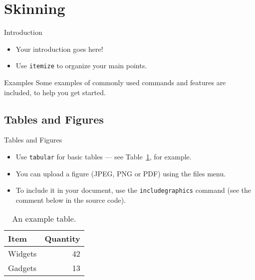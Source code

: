 \section{Skinning}

	\begin{frame}{Introduction}
		
		\begin{itemize}
			\item Your introduction goes here!
			\item Use \texttt{itemize} to organize your main points.
		\end{itemize}
		
		\vskip 1cm
		
		\begin{block}{Examples}
			Some examples of commonly used commands and features are included, to help you get started.
		\end{block}
		
	\end{frame}
	
	
	\subsection{Tables and Figures}
	
	\begin{frame}{Tables and Figures}
		
		\begin{itemize}
			\item Use \texttt{tabular} for basic tables --- see Table~\ref{tab:widgets}, for example.
			\item You can upload a figure (JPEG, PNG or PDF) using the files menu. 
			\item To include it in your document, use the \texttt{includegraphics} command (see the comment below in the source code).
		\end{itemize}
		
		
		\begin{table}
			\centering
			\begin{tabular}{l|r}
				Item & Quantity \\\hline
				Widgets & 42 \\
				Gadgets & 13
			\end{tabular}
			\caption{\label{tab:widgets}An example table.}
		\end{table}
		
	\end{frame}
	
